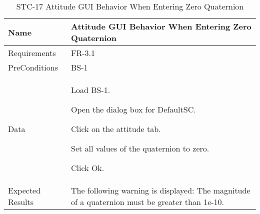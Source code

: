 
\begin{table}[htbp!]
\centering
      \begin{tabular}{|p{1.05 in} |p{4.75 in} |}
      \hline
         \rowcolor[rgb]{0.8,0.8,0.8} Name & Attitude GUI Behavior When Entering Zero Quaternion\\
         \hline
         Requirements & FR-3.1\\  \hline
         PreConditions & BS-1\\     \hline
         Data &
         \begin{compactenum}
             \item Load BS-1.
             \item Open the dialog box for DefaultSC.
             \item Click on the attitude tab.
             \item Set all values of the quaternion to zero.
             \item Click Ok.
         \end{compactenum}
         \\ \hline
         Expected Results & The following warning is displayed:  The magnitude of a quaternion must be greater than 1e-10.\\
      \hline
      \end{tabular}
      \label{Table:STC-17}
      \caption{STC-17 Attitude GUI Behavior When Entering Zero Quaternion}
\end{table} 